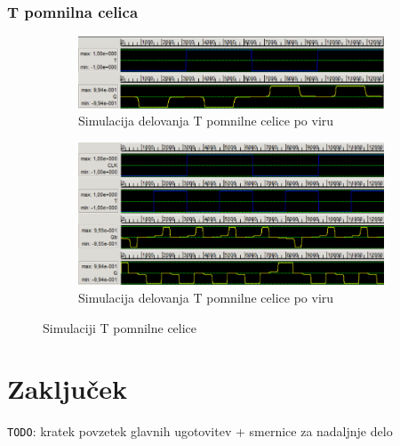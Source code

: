 \documentclass[a4paper, 11pt]{article}
\newcommand{\todo}{\textcolor{BrickRed}{\texttt{TODO}}} %
\begin{document}
\subsubsection{T pomnilna celica}
\begin{figure}[h!]
	\begin{subfigure}[b]{\textwidth}
	\includegraphics[width=\textwidth]{../img/vir_4/sim_t.png}
	\caption{Simulacija delovanja T pomnilne celice po viru \cite{quantum_dot}}
	\label{fig-t-1-sim}
	\end{subfigure}
	\begin{subfigure}[b]{\textwidth}
	\includegraphics[width=\textwidth]{../img/vir_5/sim_t.png}
	\caption{Simulacija delovanja T pomnilne celice po viru \cite{a_novel_approach}}
	\label{fig-t-2-sim}
	\end{subfigure}
	\caption{Simulaciji T pomnilne celice}
	\label{fig-t-sim}
\end{figure}

\section{Zaključek}
\todo: kratek povzetek glavnih ugotovitev + smernice za nadaljnje delo


 
\end{document}

